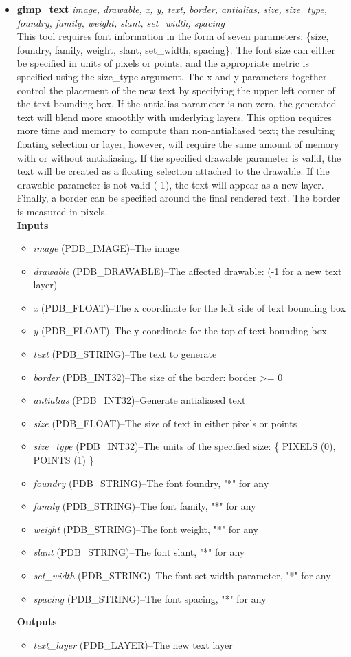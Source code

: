 \documentclass{article}
\begin{document}
\begin{itemize}
\item {\scriptsize{\bf gimp\_text} {\it image, drawable, x, y, text, border, antialias, size, size\_type, foundry, family, weight, slant, set\_width, spacing}\\
This tool requires font information in the form of seven parameters:
\{size, foundry, family, weight, slant, set\_width, spacing\}.  The
font size can either be specified in units of pixels or points, and
the appropriate metric is specified using the size\_type argument.  The
x and y parameters together control the placement of the new text by
specifying the upper left corner of the text bounding box.  If the
antialias parameter is non-zero, the generated text will blend more
smoothly with underlying layers.  This option requires more time and
memory to compute than non-antialiased text; the resulting floating
selection or layer, however, will require the same amount of memory
with or without antialiasing.  If the specified drawable parameter is
valid, the text will be created as a floating selection attached to
the drawable.  If the drawable parameter is not valid (-1), the text
will appear as a new layer.  Finally, a border can be specified around
the final rendered text.  The border is measured in pixels.\\
\bf Inputs \rm
\begin{itemize}
\item {\it image} (PDB\_IMAGE)--The image
\item {\it drawable} (PDB\_DRAWABLE)--The affected drawable: (-1 for a new text layer)
\item {\it x} (PDB\_FLOAT)--The x coordinate for the left side of text bounding box
\item {\it y} (PDB\_FLOAT)--The y coordinate for the top of text bounding box
\item {\it text} (PDB\_STRING)--The text to generate
\item {\it border} (PDB\_INT32)--The size of the border: border >= 0
\item {\it antialias} (PDB\_INT32)--Generate antialiased text
\item {\it size} (PDB\_FLOAT)--The size of text in either pixels or points
\item {\it size\_type} (PDB\_INT32)--The units of the specified size: \{ PIXELS (0), POINTS (1) \}
\item {\it foundry} (PDB\_STRING)--The font foundry, "*" for any
\item {\it family} (PDB\_STRING)--The font family, "*" for any
\item {\it weight} (PDB\_STRING)--The font weight, "*" for any
\item {\it slant} (PDB\_STRING)--The font slant, "*" for any
\item {\it set\_width} (PDB\_STRING)--The font set-width parameter, "*" for any
\item {\it spacing} (PDB\_STRING)--The font spacing, "*" for any
\end{itemize}
\bf Outputs \rm
\begin{itemize}
\item {\it text\_layer} (PDB\_LAYER)--The new text layer
\end{itemize}}


\end{itemize}
\end{document}
